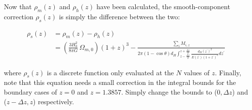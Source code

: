 \documentclass[12pt]{article}
\begin{document}
Now that $\rho_m(z)$ and $\rho_h(z)$ have been calculated, the smooth-component correction $\rho_s(z)$ is simply the difference between the two:

\begin{align}\label{smooth_component} 
\rho_s(z)&=\rho_m(z)-\rho_h(z)\nonumber\\
&=\left(\frac{3H_0^2}{8\pi G}\,\Omega_{m,0}\right)(1+z)^3 - \frac{\sum_i M_{i,z}}{2\pi(1-\cos\theta)d_H\int_{z-\frac{\Delta z}{2}}^{z+\frac{\Delta z}{2}} \frac{d_M(z^\prime)^2}{E(z^\prime)(1+z^\prime)^3}dz^\prime}
\end{align}

where $\rho_s(z)$ is a discrete function only evaluated at the $N$ values of $z$. Finally, note that this equation needs a small correction in the integral bounds for the boundary cases of $z=0$ and $z=1.3857$. Simply change the bounds to ($0,\Delta z$) and ($z-\Delta z,z$) respectively.
\end{document}

